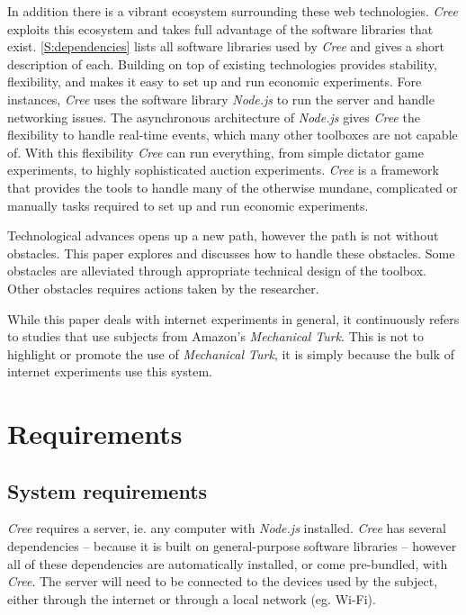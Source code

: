 \documentclass[preprint, 12pt]{elsarticle}
\newcommand{\Cree}{\emph{Cree}\xspace}
\begin{document}
In addition there is a vibrant ecosystem surrounding these web technologies. \Cree exploits this ecosystem and takes full advantage of the software libraries that exist. \ref{S:dependencies} lists all software libraries used by \Cree and gives a short description of each. Building on top of existing technologies provides stability, flexibility, and makes it easy to set up and run economic experiments. Fore instances, \Cree uses the software library \emph{Node.js} to run the server and handle networking issues. The asynchronous architecture of \emph{Node.js} gives \Cree the flexibility to handle real-time events, which many other toolboxes are not capable of. With this flexibility \Cree can run everything, from simple dictator game experiments, to highly sophisticated auction experiments. \Cree is a framework that provides the tools to handle many of the otherwise mundane, complicated or manually tasks required to set up and run economic experiments.

Technological advances opens up a new path, however the path is not without obstacles. This paper explores and discusses how to handle these obstacles. Some obstacles are alleviated through appropriate technical design of the toolbox. Other obstacles requires actions taken by the researcher.

While this paper deals with internet experiments in general, it continuously refers to studies that use subjects from Amazon's \emph{Mechanical Turk}. This is not to highlight or promote the use of \emph{Mechanical Turk}, it is simply because the bulk of internet experiments use this system.

\section{Requirements}
\label{S:Requirements}

\subsection{System requirements}

\Cree requires a server, ie. any computer with \emph{Node.js} installed. \Cree has several dependencies -- because it is built on general-purpose software libraries -- however all of these dependencies are automatically installed, or come pre-bundled, with \Cree. The server will need to be connected to the devices used by the subject, either through the internet or through a local network (eg. Wi-Fi). 
\end{document}

